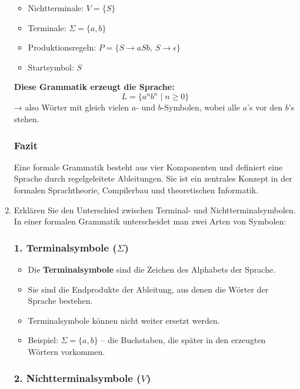 \documentclass[a4paper,12pt]{article}
\begin{document}
\begin{enumerate}
			\begin{itemize}
				\item Nichtterminale: \( V = \{S\} \)
				\item Terminale: \( \Sigma = \{a, b\} \)
				\item Produktionsregeln: \( P = \{S \rightarrow aSb,\ S \rightarrow \epsilon\} \)
				\item Startsymbol: \( S \)
			\end{itemize}
			
			\textbf{Diese Grammatik erzeugt die Sprache:}
			\[
			L = \{ a^n b^n \mid n \geq 0 \}
			\]
			→ also Wörter mit gleich vielen \( a \)- und \( b \)-Symbolen, wobei alle \( a \)'s vor den \( b \)'s stehen.
			
			\subsubsection*{Fazit}
			
			Eine formale Grammatik besteht aus vier Komponenten und definiert eine Sprache durch regelgeleitete Ableitungen. Sie ist ein zentrales Konzept in der formalen Sprachtheorie, Compilerbau und theoretischen Informatik.
			
			\item Erklären Sie den Unterschied zwischen Terminal- und Nichtterminalsymbolen.\\
			
			In einer formalen Grammatik unterscheidet man zwei Arten von Symbolen:
			
			\subsubsection*{1. Terminalsymbole (\( \Sigma \))}
			
			\begin{itemize}
				\item Die \textbf{Terminalsymbole} sind die Zeichen des Alphabets der Sprache.
				\item Sie sind die Endprodukte der Ableitung, aus denen die Wörter der Sprache bestehen.
				\item Terminalsymbole können nicht weiter ersetzt werden.
				\item Beispiel: \( \Sigma = \{a, b\} \) – die Buchstaben, die später in den erzeugten Wörtern vorkommen.
			\end{itemize}
			
			\subsubsection*{2. Nichtterminalsymbole (\( V \))}
			

\end{enumerate}
\end{document}

